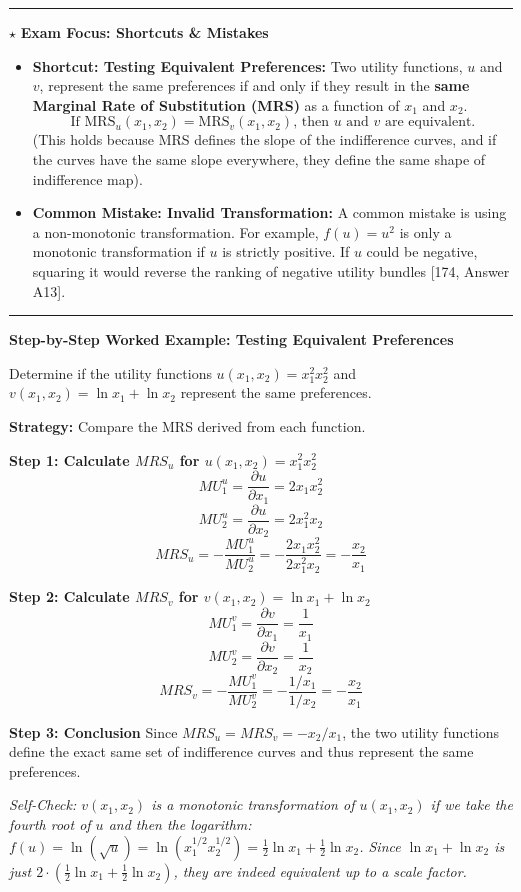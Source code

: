 \documentclass{article}
\begin{document}
\noindent\rule{\linewidth}{0.4pt}

\noindent $\star$ \textbf{Exam Focus: Shortcuts \& Mistakes}

\begin{itemize}
    \item \textbf{Shortcut: Testing Equivalent Preferences:} Two utility functions, $u$ and $v$, represent the same preferences if and only if they result in the \textbf{same Marginal Rate of Substitution (MRS)} as a function of $x_1$ and $x_2$. \[\text{If } \text{MRS}_u(x_1, x_2) = \text{MRS}_v(x_1, x_2) \text{, then } u \text{ and } v \text{ are equivalent.}\] (This holds because MRS defines the slope of the indifference curves, and if the curves have the same slope everywhere, they define the same shape of indifference map).
    \item \textbf{Common Mistake: Invalid Transformation:} A common mistake is using a non-monotonic transformation. For example, $f(u)=u^2$ is only a monotonic transformation if $u$ is strictly positive. If $u$ could be negative, squaring it would reverse the ranking of negative utility bundles [174, Answer A13].
\end{itemize}

\noindent\rule{\linewidth}{0.4pt}

\noindent\textbf{Step-by-Step Worked Example: Testing Equivalent Preferences}

Determine if the utility functions $u(x_1, x_2) = x_1^2 x_2^2$ and $v(x_1, x_2) = \ln x_1 + \ln x_2$ represent the same preferences.

\textbf{Strategy:} Compare the MRS derived from each function.

\textbf{Step 1: Calculate $MRS_u$ for $u(x_1, x_2) = x_1^2 x_2^2$} \[MU_1^u = \frac{\partial u}{\partial x_1} = 2x_1 x_2^2\] \[MU_2^u = \frac{\partial u}{\partial x_2} = 2x_1^2 x_2\] \[MRS_u = -\frac{MU_1^u}{MU_2^u} = -\frac{2x_1 x_2^2}{2x_1^2 x_2} = -\frac{x_2}{x_1}\]

\textbf{Step 2: Calculate $MRS_v$ for $v(x_1, x_2) = \ln x_1 + \ln x_2$} \[MU_1^v = \frac{\partial v}{\partial x_1} = \frac{1}{x_1}\] \[MU_2^v = \frac{\partial v}{\partial x_2} = \frac{1}{x_2}\] \[MRS_v = -\frac{MU_1^v}{MU_2^v} = -\frac{1/x_1}{1/x_2} = -\frac{x_2}{x_1}\]

\textbf{Step 3: Conclusion}
Since $MRS_u = MRS_v = -x_2/x_1$, the two utility functions define the exact same set of indifference curves and thus represent the same preferences.

\textit{Self-Check: $v(x_1, x_2)$ is a monotonic transformation of $u(x_1, x_2)$ if we take the fourth root of $u$ and then the logarithm: $f(u) = \ln(\sqrt{u}) = \ln(x_1^{1/2} x_2^{1/2}) = \frac{1}{2}\ln x_1 + \frac{1}{2}\ln x_2$. Since $\ln x_1 + \ln x_2$ is just $2 \cdot (\frac{1}{2}\ln x_1 + \frac{1}{2}\ln x_2)$, they are indeed equivalent up to a scale factor.}
\end{document}
